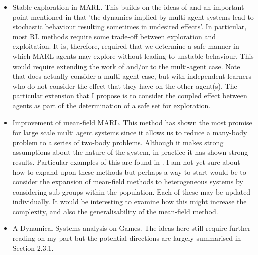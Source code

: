 \documentclass[preprint,11pt]{report}
\begin{document}
\begin{itemize}
	\item Stable exploration in MARL. This builds on the ideas of \cite{Berkenkamp2017,Jin2018Stability-certifiedPerspective} and
	an important point mentioned in \cite{Marinescu2014} that 'the dynamics implied by multi-agent
	systems lead to stochastic behaviour resulting sometimes in undesired effects'. In particular,
	most RL methods require some trade-off between exploration and exploitation. It is, therefore,
	required that we determine a safe manner in which MARL agents may explore without leading to
	unstable behaviour. This would require extending the work of \cite{Berkenkamp2017} and/or 
	\cite{Jin2018Stability-certifiedPerspective} to the multi-agent case. Note that 
	\cite{Jin2018Stability-certifiedPerspective} does actually consider a multi-agent case, but with
	independent learners who do not consider the effect that they have on the other agent(s). The
	particular extension that I propose is to consider the coupled effect between agents as part of
	the determination of a safe set for exploration.

	\item Improvement of mean-field MARL. This method has shown the most promise for large scale
	multi agent systems since it allows us to reduce a many-body problem to a series of two-body
	problems. Although it makes strong assumptions about the nature of the system, in practice it
	has shown strong results. Particular examples of this are found in 
	\cite{Subramanian2019,Yang2018}. I am not yet sure about how to expand upon these methods but
	perhaps a way to start would be to consider the expansion of mean-field methods to heterogeneous
	systems by considering sub-groups within the population. Each of these may be updated
	individually. It would be interesting to examine how this might increase the complexity, and
	also the generalisability of the mean-field method.
	\item A Dynamical Systems analysis on Games. The ideas here still require further reading on my
	part but the potential directions are largely summarised in Section 2.3.1.
\end{itemize}

 


\end{document}

